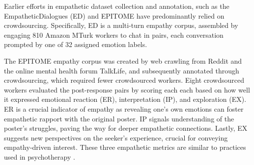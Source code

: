 Earlier efforts in empathetic dataset collection and annotation, such as the EmpatheticDialogues (ED) \cite{rashkin-etal-2019-towards} and EPITOME \cite{sharma-etal-2020-computational} have predominantly relied on crowdsourcing. Specifically, ED is a multi-turn empathy corpus, assembled by engaging 810 Amazon MTurk workers to chat in pairs, each conversation prompted by one of 32 assigned emotion labels. 

The EPITOME empathy corpus \cite{sharma-etal-2020-computational} was created by web crawling from Reddit and the online mental health forum TalkLife, and subsequently annotated through crowdsourcing, which required fewer crowdsourced workers. Eight crowdsourced workers evaluated the post-response pairs by scoring each each based on how well it expressed emotional reaction (ER), interpretation (IP), and exploration (EX).
ER is a crucial indicator of empathy as revealing one's own emotions can foster empathetic rapport with the original poster. IP signals understanding of the poster's struggles, paving the way for deeper empathetic connections. Lastly, EX suggests new perspectives on the seeker’s experience, crucial for conveying empathy-driven interest.
These three empathetic metrics are similar to practices used in psychotherapy \cite{fuller2021conceptualizing, jani2012role, chen2024detecting}.

